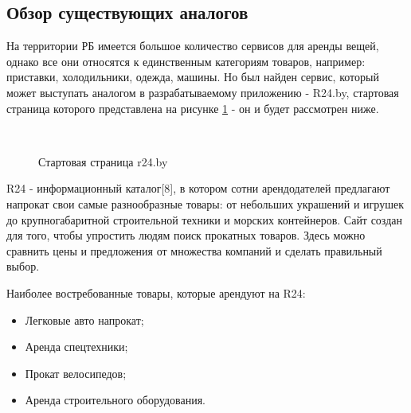 \subsection{Обзор существующих аналогов}
На территории РБ имеется большое количество сервисов для аренды вещей, однако все они относятся к единственным категориям товаров, например: приставки, холодильники, одежда, машины.
Но был найден сервис, который может выступать аналогом в разрабатываемому приложению - R24.by, стартовая страница которого представлена на рисунке \ref{analogue:start} - он и будет рассмотрен ниже.

\begin{figure}[!htb]
  \centering
      \\
      \caption{Стартовая страница r24.by}
      \label{analogue:start}
\end{figure}

R24 - информационный каталог[8], в котором сотни арендодателей предлагают напрокат свои самые разнообразные товары: от небольших украшений и игрушек до крупногабаритной строительной техники и морских контейнеров.
Сайт создан для того, чтобы упростить людям поиск прокатных товаров.
Здесь можно сравнить цены и предложения от множества компаний и сделать правильный выбор.

Наиболее востребованные товары, которые арендуют на R24:
\begin{itemize}
  \item Легковые авто напрокат;
  \item Аренда спецтехники;
  \item Прокат велосипедов;
  \item Аренда строительного оборудования.
\end{itemize}


